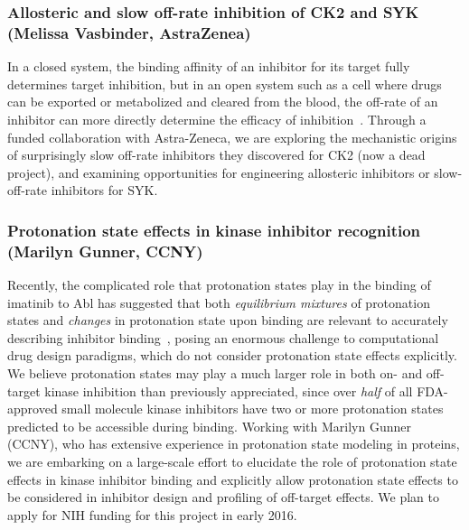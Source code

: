 \documentclass[10pt]{article}
\begin{document}
\vspace{-0.5cm}
\subsubsection*{Allosteric and slow off-rate inhibition of CK2 and SYK (Melissa Vasbinder, AstraZenea)}
\vspace{-0.3cm}
In a closed system, the binding affinity of an inhibitor for its target fully determines target inhibition, but in an open system such as a cell where drugs can be exported or metabolized and cleared from the blood, the off-rate of an inhibitor can more directly determine the efficacy of inhibition~\cite{copeland:nrdd:2007:residence-time}.
Through a funded collaboration with Astra-Zeneca, we are exploring the mechanistic origins of surprisingly slow off-rate inhibitors they discovered for CK2 (now a dead project), and examining opportunities for engineering allosteric inhibitors or slow-off-rate inhibitors for SYK.

\vspace{-0.3cm}
\subsubsection*{Protonation state effects in kinase inhibitor recognition (Marilyn Gunner, CCNY)}
\vspace{-0.3cm}
Recently, the complicated role that protonation states play in the binding of imatinib to Abl has suggested that both \emph{equilibrium mixtures} of protonation states and \emph{changes} in protonation state upon binding are relevant to accurately describing inhibitor binding~\cite{szakacks:j-med-chem:2005:acid-base-profiling-of-imatinib,seeliger:2007:structure:imatinib-binding,roux:pnas:2013:gleevec-selectivity}, posing an enormous challenge to computational drug design paradigms, which do not consider protonation state effects explicitly.
We believe protonation states may play a much larger role in both on- and off-target kinase inhibition than previously appreciated, since over \emph{half} of all FDA-approved small molecule kinase inhibitors have two or more protonation states predicted to be accessible during binding.
Working with Marilyn Gunner (CCNY), who has extensive experience in protonation state modeling in proteins, we are embarking on a large-scale effort to elucidate the role of protonation state effects in kinase inhibitor binding and explicitly allow protonation state effects to be considered in inhibitor design and profiling of off-target effects.
We plan to apply for NIH funding for this project in early 2016.
\end{document}
